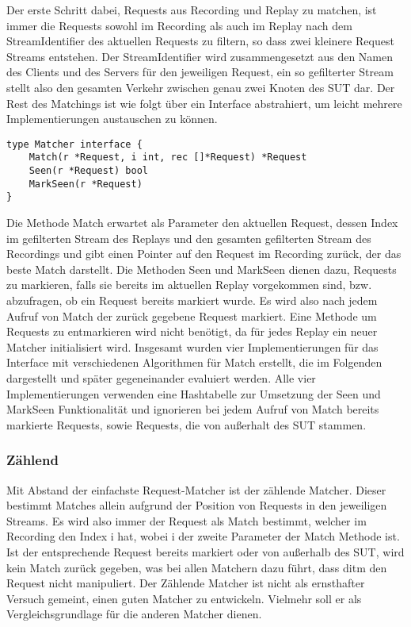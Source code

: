 \documentclass[a4paper]{report}
\begin{document}
Der erste Schritt dabei, Requests aus Recording und Replay zu matchen, ist immer die Requests sowohl im
Recording als auch im Replay nach dem StreamIdentifier des aktuellen Requests zu filtern, so dass zwei
kleinere Request Streams entstehen. Der StreamIdentifier wird zusammengesetzt aus den Namen des Clients
und des Servers für den jeweiligen Request, ein so gefilterter Stream stellt also den gesamten Verkehr
zwischen genau zwei Knoten des SUT dar.
Der Rest des Matchings ist wie folgt über ein Interface abstrahiert, um leicht mehrere Implementierungen
austauschen zu können.
\begin{verbatim}
type Matcher interface {
   	Match(r *Request, i int, rec []*Request) *Request
   	Seen(r *Request) bool
    MarkSeen(r *Request)
}
\end{verbatim}
Die Methode Match erwartet als Parameter den aktuellen Request, dessen Index im gefilterten Stream des Replays
und den gesamten gefilterten Stream des Recordings und gibt einen Pointer auf den Request im Recording zurück,
der das beste Match darstellt. Die Methoden Seen und MarkSeen dienen dazu, Requests zu markieren, falls sie bereits
im aktuellen Replay vorgekommen sind, bzw. abzufragen, ob ein Request bereits markiert wurde. Es wird also nach jedem Aufruf
von Match der zurück gegebene Request markiert. Eine Methode um Requests zu entmarkieren wird nicht benötigt, da für
jedes Replay ein neuer Matcher initialisiert wird. Insgesamt wurden vier Implementierungen für das Interface mit
verschiedenen Algorithmen für Match erstellt, die im Folgenden dargestellt und später gegeneinander evaluiert werden.
Alle vier Implementierungen verwenden eine Hashtabelle zur Umsetzung der Seen und MarkSeen Funktionalität und ignorieren
bei jedem Aufruf von Match bereits markierte Requests, sowie Requests, die von außerhalt des SUT stammen.
\subsubsection{Zählend}
Mit Abstand der einfachste Request-Matcher ist der zählende Matcher. Dieser bestimmt Matches allein aufgrund der Position
von Requests in den jeweiligen Streams. Es wird also immer der Request als Match bestimmt, welcher im Recording den Index i hat,
wobei i der zweite Parameter der Match Methode ist. Ist der entsprechende Request bereits markiert oder von außerhalb des SUT,
wird kein Match zurück gegeben, was bei allen Matchern dazu führt, dass ditm den Request nicht manipuliert.
Der Zählende Matcher ist nicht als ernsthafter Versuch gemeint, einen guten Matcher zu entwickeln. Vielmehr soll
er als Vergleichsgrundlage für die anderen Matcher dienen.
\end{document}
